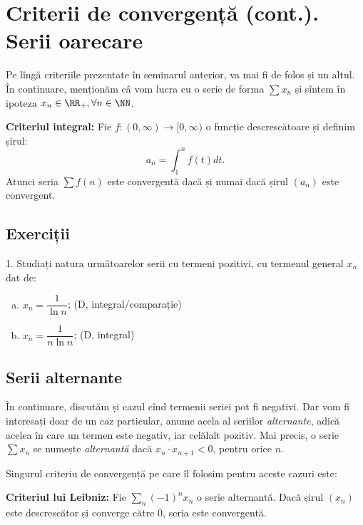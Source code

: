 
\chapter{Criterii de convergență (cont.). Serii oarecare}

Pe lîngă criteriile prezentate în seminarul anterior, va mai fi de folos și un altul. 
În continuare, menționăm câ vom lucra cu o serie de forma $ \sum x_n $ și 
sîntem în ipoteza $ x_n \in \RR_+, \forall n \in \NN $.

\textbf{Criteriul integral:} Fie $ f : (0, \infty) \to [0, \infty) $ o funcție
descrescătoare și definim șirul:
\[
    a_n = \int_1^n f(t) dt.
\]
Atunci seria $ \sum f(n) $ este convergentă dacă și numai dacă șirul $ (a_n) $ este
convergent.

\section{Exerciții}

1. Studiați natura următoarelor serii cu termeni pozitivi, cu termenul
general $ x_n $ dat de:
\begin{enumerate}[(a)]
    \item $ x_n = \dfrac{1}{\ln n} $; \hfill(D, integral/comparație)
    \item $ x_n = \dfrac{1}{n \ln n} $; \hfill(D, integral)
\end{enumerate}

\section{Serii alternante}

În continuare, discutăm și cazul cînd termenii seriei pot fi negativi. Dar
vom fi interesați doar de un caz particular, anume acela al seriilor \emph{alternante},
adică acelea în care un termen este negativ, iar celălalt pozitiv. Mai precis,
o serie $ \sum x_n $ se numește \emph{alternantă} dacă $ x_n \cdot x_{n+1} < 0 $, 
pentru orice $ n $.

Singurul criteriu de convergență pe care îl folosim pentru aceste cazuri este:

\textbf{Criteriul lui Leibniz:} Fie $ \sum_n (-1)^n x_n $ o serie
alternantă. Dacă șirul $ (x_n) $ este descrescător și converge către 0,
seria este convergentă.

